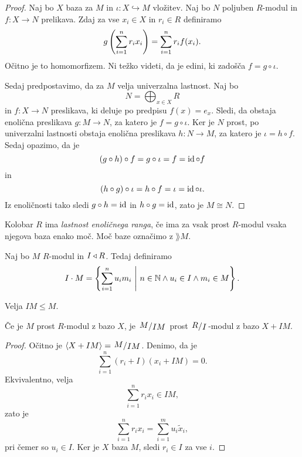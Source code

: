 \begin{proof}
Naj bo $X$ baza za $M$ in $\iota \colon X \hookrightarrow M$
vložitev. Naj bo $N$ poljuben $R$-modul in $f \colon X \to N$
prelikava. Zdaj za vse $x_i \in X$ in $r_i \in R$ definiramo
\[
g \left(\sum_{i=1}^n r_i x_i\right) = \sum_{i=1}^n r_i f(x_i).
\]
Očitno je to homomorfizem. Ni težko videti, da je edini, ki zadošča
$f = g \circ \iota$.

Sedaj predpostavimo, da za $M$ velja univerzalna lastnost. Naj bo
\[
N = \bigoplus_{x \in X} R
\]
in $f \colon X \to N$ preslikava, ki deluje po predpisu
$f(x) = e_x$. Sledi, da obstaja enolična preslikava
$g \colon M \to N$, za katero je $f = g \circ \iota$. Ker je $N$
prost, po univerzalni lastnosti obstaja enolična preslikava
$h \colon N \to M$, za katero je $\iota = h \circ f$. Sedaj
opazimo, da je
\[
(g \circ h) \circ f = g \circ \iota = f = \operatorname{id} \circ f
\]
in
\[
(h \circ g) \circ \iota = h \circ f = \iota = \operatorname{id} \circ \iota.
\]
Iz enoličnosti tako sledi $g \circ h = \operatorname{id}$ in $h \circ g = \operatorname{id}$,
zato je $M \cong N$.
\end{proof}

\begin{definicija}
Kolobar $R$ ima
\emph{lastnost enoličnega ranga}, če
ima za vsak prost $R$-modul vsaka njegova baza enako moč. Moč baze
označimo z $\rang M$.
\end{definicija}

\begin{definicija}
Naj bo $M$ $R$-modul in $I \triangleleft R$. Tedaj definiramo
\[
I \cdot M = \left\{\sum_{i=1}^n u_i m_i~\middle\vert~n \in \mathbb{N} \land u_i \in I \land m_i \in M\right\}.
\]
\end{definicija}

\begin{opomba}
Velja $IM \leq M$.
\end{opomba}

\begin{lema}
Če je $M$ prost $R$-modul z bazo $X$, je $\kvoc{M}{IM}$ prost
$\kvoc{R}{I}$-modul z bazo $X + IM$.
\end{lema}

\begin{proof}
Očitno je $\skl{X + IM} = \kvoc{M}{IM}$. Denimo, da je
\[
\sum_{i=1}^n (r_i + I)(x_i + IM) = 0.
\]
Ekvivalentno, velja
\[
\sum	_{i=1}^n r_i x_i \in IM,
\]
zato je
\[
\sum_{i=1}^n r_i x_i = \sum_{i=1}^m u_i \tilde{x}_i,
\]
pri čemer so $u_i \in I$. Ker je $X$ baza $M$, sledi $r_i \in I$ za
vse $i$.
\end{proof}

